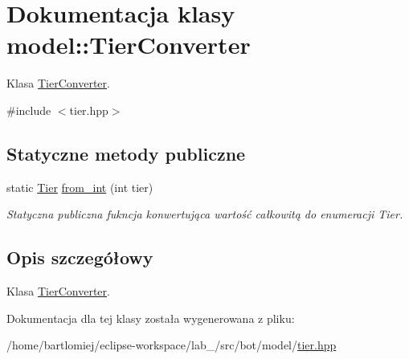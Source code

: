 \hypertarget{classmodel_1_1TierConverter}{}\section{Dokumentacja klasy model\+:\+:Tier\+Converter}
\label{classmodel_1_1TierConverter}


Klasa \hyperlink{classmodel_1_1TierConverter}{Tier\+Converter}.  




{\ttfamily \#include $<$tier.\+hpp$>$}

\subsection*{Statyczne metody publiczne}
\begin{DoxyCompactItemize}
\item 
\mbox{\label{classmodel_1_1TierConverter_ab3699fb224493ff4bb99d98be4af5b9f}} 
static \hyperlink{tier_8hpp_a50a003ab1ea342f138c038fabfd1ee55}{Tier} \hyperlink{classmodel_1_1TierConverter_ab3699fb224493ff4bb99d98be4af5b9f}{from\+\_\+int} (int tier)
\begin{DoxyCompactList}\small\item\em Statyczna publiczna fukncja konwertująca wartość całkowitą do enumeracji Tier. \end{DoxyCompactList}\end{DoxyCompactItemize}


\subsection{Opis szczegółowy}
Klasa \hyperlink{classmodel_1_1TierConverter}{Tier\+Converter}. 

Dokumentacja dla tej klasy została wygenerowana z pliku\+:\begin{DoxyCompactItemize}
\item 
/home/bartlomiej/eclipse-\/workspace/lab\+\_/src/bot/model/\hyperlink{tier_8hpp}{tier.\+hpp}\end{DoxyCompactItemize}
